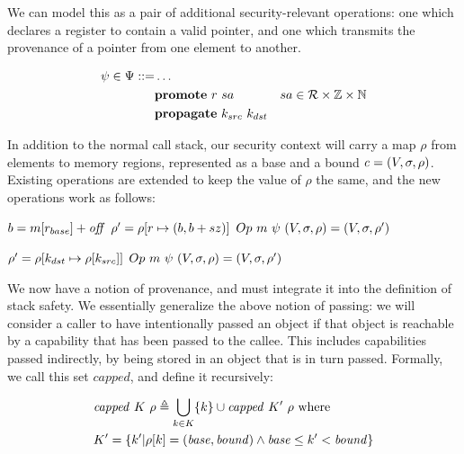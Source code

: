 \documentclass[10pt,conference]{ieeetran}%
\theoremstyle{definition}
\begin{document}
We can model this as a pair of additional security-relevant operations: one which
declares a register to contain a valid pointer, and one which transmits the provenance
of a pointer from one element to another.

\begin{align*}
  \psi \in \Psi ::= & \dots \\
  & \mathbf{promote} ~ r ~ sa & sa \in {\mathcal R} \times \mathbb{Z} \times \mathbb{N} \\
  & \mathbf{propagate} ~ k_{src} ~ k_{dst} \\
\end{align*}

In addition to the normal call stack, our security context will carry a map \(\rho\) from
elements to memory regions, represented as a base and a bound \(\mathit{c} = (V, \sigma, \rho)\).
Existing operations are extended to keep the value of \(\rho\) the same, and the new operations
work as follows:

                  {\(b = m[r_{base}]+\mathit{off}\)}
                  {\(\rho' = \rho[r \mapsto (b,b+sz)]\)}
                  {\(Op ~ m ~ \psi ~ (V,\sigma,\rho) = (V,\sigma,\rho')\)}

            {\(\rho' = \rho[k_{dst} \mapsto \rho[k_{src}]]\)}
            {\(Op ~ m ~ \psi ~ (V,\sigma,\rho) = (V,\sigma,\rho')\)}

We now have a notion of provenance, and must integrate it into the definition of
stack safety. We essentially generalize the above notion of passing: we will consider
a caller to have intentionally passed an object if that object is reachable by
a capability that has been passed to the callee. This includes capabilities passed
indirectly, by being stored in an object that is in turn passed. Formally, we call
this set \(\mathit{capped}\), and define it recursively:

\[\begin{split}
& \mathit{capped} ~ K ~ \rho \triangleq \bigcup_{k \in K} \{k\} \cup \mathit{capped} ~ K' ~ \rho \textnormal{ where} \\
& K' = \{k' |\rho[k] = (\mathit{base},\mathit{bound})
\land \mathit{base} \leq k' < \mathit{bound}\} \\
\end{split}\]
\end{document}

